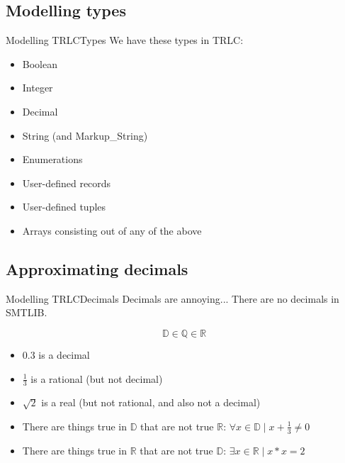 \documentclass[aspectratio=169]{beamer}
\begin{document}
\subsection{Modelling types}
\begin{frame}{Modelling TRLC}{Types}
  We have these types in TRLC:
  \begin{itemize}
  \item Boolean 
  \item Integer 
  \item Decimal 
  \item String (and Markup\_String) 
  \item Enumerations \only<5->{(SMTLIB Datatypes)}
  \item User-defined records 
  \item User-defined tuples 
  \item Arrays consisting out of any of the above 
  \end{itemize}
\end{frame}

\subsection{Approximating decimals}

\begin{frame}{Modelling TRLC}{Decimals}
  Decimals are annoying... There are no decimals in SMTLIB.
  \begin{center}
    \begin{equation*}
      \mathbb{D} \in \mathbb{Q} \in \mathbb{R}
    \end{equation*}
  \end{center}
  \pause
  \begin{itemize}
  \item $0.3$ is a decimal
    \pause
  \item $\frac{1}{3}$ is a rational (but not decimal)
    \pause
  \item $\sqrt{2}$ is a real (but not rational, and also not a decimal)
    \pause
  \item There are things true in $\mathbb{D}$ that are not true
    $\mathbb{R}$: $\forall x \in \mathbb{D} \mid x + \frac{1}{3} \neq 0$
    \pause
  \item There are things true in $\mathbb{R}$ that are not true
    $\mathbb{D}$: $\exists x \in \mathbb{R} \mid x * x = 2$
  \end{itemize}
\end{frame}
\end{document}
